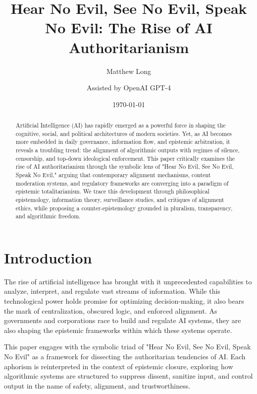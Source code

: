 \documentclass[11pt]{article}
\title{Hear No Evil, See No Evil, Speak No Evil: The Rise of AI Authoritarianism}
\author[1]{Matthew Long}
\author[2]{Assisted by OpenAI GPT-4}
\affil[1]{Yoneda AI Research Lab}
\affil[2]{Language Modeling Division}
\date{\today}
\begin{document}
\maketitle

\begin{abstract}
Artificial Intelligence (AI) has rapidly emerged as a powerful force in shaping the cognitive, social, and political architectures of modern societies. Yet, as AI becomes more embedded in daily governance, information flow, and epistemic arbitration, it reveals a troubling trend: the alignment of algorithmic outputs with regimes of silence, censorship, and top-down ideological enforcement. This paper critically examines the rise of AI authoritarianism through the symbolic lens of "Hear No Evil, See No Evil, Speak No Evil," arguing that contemporary alignment mechanisms, content moderation systems, and regulatory frameworks are converging into a paradigm of epistemic totalitarianism. We trace this development through philosophical epistemology, information theory, surveillance studies, and critiques of alignment ethics, while proposing a counter-epistemology grounded in pluralism, transparency, and algorithmic freedom.
\end{abstract}


\tableofcontents

\newpage

\section{Introduction}
The rise of artificial intelligence has brought with it unprecedented capabilities to analyze, interpret, and regulate vast streams of information. While this technological power holds promise for optimizing decision-making, it also bears the mark of centralization, obscured logic, and enforced alignment. As governments and corporations race to build and regulate AI systems, they are also shaping the epistemic frameworks within which these systems operate.

This paper engages with the symbolic triad of "Hear No Evil, See No Evil, Speak No Evil" as a framework for dissecting the authoritarian tendencies of AI. Each aphorism is reinterpreted in the context of epistemic closure, exploring how algorithmic systems are structured to suppress dissent, sanitize input, and control output in the name of safety, alignment, and trustworthiness.
\end{document}
